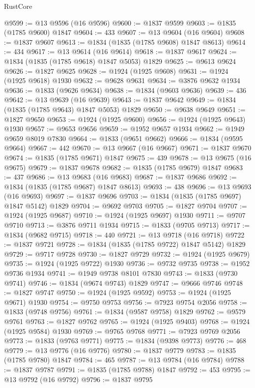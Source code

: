 \begin{lexlean}{RustCore}
\begin{coremodule}
@9599 := @13 @9596 (@16 @9596)
@9600 := @1837 @9599
@9603 := @1835 (@1785 @9600) @1847
@9604 := 433
@9607 := @13 @9604 (@16 @9604)
@9608 := @1837 @9607
@9613 := @1834 (@1835 (@1785 @9608) @1847 @8613)
@9614 := 434
@9617 := @13 @9614 (@16 @9614)
@9618 := @1837 @9617
@9624 := @1834 (@1835 (@1785 @9618) @1847 @5053) @1829
@9625 := @9613 @9624
@9626 := @1827 @9625
@9628 := @1924 (@1925 @9608)
@9631 := @1924 (@1925 @9618) @1930
@9632 := @9628 @9631
@9634 := @3876 @9632 @1934
@9636 := @1833 (@9626 @9634)
@9638 := @1834 (@9603 @9636)
@9639 := 436
@9642 := @13 @9639 (@16 @9639)
@9643 := @1837 @9642
@9649 := @1834 (@1835 (@1785 @9643) @1847 @5053) @1829
@9650 := @9638 @9649
@9651 := @1827 @9650
@9653 := @1924 (@1925 @9600)
@9656 := @1924 (@1925 @9643) @1930
@9657 := @9653 @9656
@9659 := @1952 @9657 @1934
@9662 := @1949 @9659 @8019 @7830
@9664 := @1833 (@9651 @9662)
@9666 := @1834 (@9595 @9664)
@9667 := 442
@9670 := @13 @9667 (@16 @9667)
@9671 := @1837 @9670
@9674 := @1835 (@1785 @9671) @1847
@9675 := 439
@9678 := @13 @9675 (@16 @9675)
@9679 := @1837 @9678
@9682 := @1835 (@1785 @9679) @1847
@9683 := 437
@9686 := @13 @9683 (@16 @9683)
@9687 := @1837 @9686
@9692 := @1834 (@1835 (@1785 @9687) @1847 @8613)
@9693 := 438
@9696 := @13 @9693 (@16 @9693)
@9697 := @1837 @9696
@9703 := @1834 (@1835 (@1785 @9697) @1847 @5142) @1829
@9704 := @9692 @9703
@9705 := @1827 @9704
@9707 := @1924 (@1925 @9687)
@9710 := @1924 (@1925 @9697) @1930
@9711 := @9707 @9710
@9713 := @3876 @9711 @1934
@9715 := @1833 (@9705 @9713)
@9717 := @1834 (@9682 @9715)
@9718 := 440
@9721 := @13 @9718 (@16 @9718)
@9722 := @1837 @9721
@9728 := @1834 (@1835 (@1785 @9722) @1847 @5142) @1829
@9729 := @9717 @9728
@9730 := @1827 @9729
@9732 := @1924 (@1925 @9679)
@9735 := @1924 (@1925 @9722) @1930
@9736 := @9732 @9735
@9738 := @1952 @9736 @1934
@9741 := @1949 @9738 @8101 @7830
@9743 := @1833 (@9730 @9741)
@9746 := @1834 (@9674 @9743) @1829
@9747 := @9666 @9746
@9748 := @1827 @9747
@9750 := @1924 (@1925 @9592)
@9753 := @1924 (@1925 @9671) @1930
@9754 := @9750 @9753
@9756 := @7923 @9754 @2056
@9758 := @1833 (@9748 @9756)
@9761 := @1834 (@9587 @9758) @1829
@9762 := @9579 @9761
@9763 := @1827 @9762
@9765 := @1924 (@1925 @9403)
@9768 := @1924 (@1925 @9584) @1930
@9769 := @9765 @9768
@9771 := @7923 @9769 @2056
@9773 := @1833 (@9763 @9771)
@9775 := @1834 (@9398 @9773)
@9776 := 468
@9779 := @13 @9776 (@16 @9776)
@9780 := @1837 @9779
@9783 := @1835 (@1785 @9780) @1847
@9784 := 465
@9787 := @13 @9784 (@16 @9784)
@9788 := @1837 @9787
@9791 := @1835 (@1785 @9788) @1847
@9792 := 453
@9795 := @13 @9792 (@16 @9792)
@9796 := @1837 @9795

\end{coremodule}
\end{lexlean}
